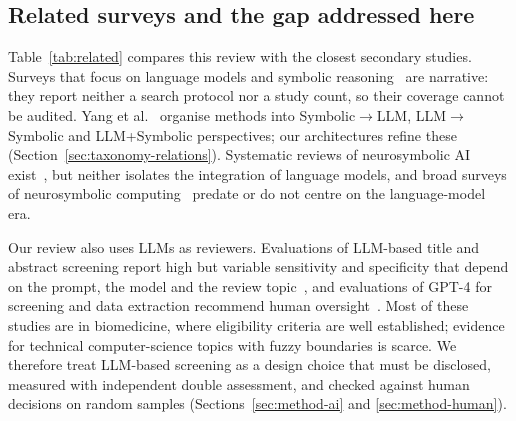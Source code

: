 \subsection{Related surveys and the gap addressed here}
Table~\ref{tab:related} compares this review with the closest secondary studies. Surveys that focus on language models and symbolic reasoning~\cite{yang2025neuro,cheng2025empowering,rani2025advancing} are narrative: they report neither a search protocol nor a study count, so their coverage cannot be audited. Yang et al.~\cite{yang2025neuro} organise methods into Symbolic$\rightarrow$LLM, LLM$\rightarrow$Symbolic and LLM+Symbolic perspectives; our architectures refine these (Section~\ref{sec:taxonomy-relations}). Systematic reviews of neurosymbolic AI exist~\cite{colelough2025neurosymbolic,delvecchio2025neuro}, but neither isolates the integration of language models, and broad surveys of neurosymbolic computing~\cite{wang2025data,lamb2020graph,deraedt2020statistical} predate or do not centre on the language-model era.

Our review also uses LLMs as reviewers. Evaluations of LLM-based title and abstract screening report high but variable sensitivity and specificity that depend on the prompt, the model and the review topic~\cite{guo2024automated,tran2024sensitivity,dennstadt2024title}, and evaluations of GPT-4 for screening and data extraction recommend human oversight~\cite{khraisha2024can}. Most of these studies are in biomedicine, where eligibility criteria are well established; evidence for technical computer-science topics with fuzzy boundaries is scarce. We therefore treat LLM-based screening as a design choice that must be disclosed, measured with independent double assessment, and checked against human decisions on random samples (Sections~\ref{sec:method-ai} and \ref{sec:method-human}).

